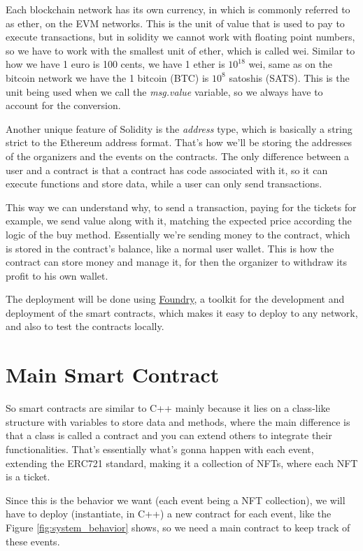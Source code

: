 Each blockchain network has its own currency, in which is commonly referred to as ether, on the EVM networks. This is the unit of value that is used to pay to execute transactions, but in solidity we cannot work with floating point numbers, so we have to work with the smallest unit of ether, which is called wei. Similar to how we have 1 euro is 100 cents, we have 1 ether is $10^{18}$ wei, same as on the bitcoin network we have the 1 bitcoin (BTC) is $10^{8}$ satoshis (SATS). This is the unit being used when we call the \textit{msg.value} variable, so we always have to account for the conversion.

Another unique feature of Solidity is the \textit{address} type, which is basically a string strict to the Ethereum address format. That's how we'll be storing the addresses of the organizers and the events on the contracts. The only difference between a user and a contract is that a contract has code associated with it, so it can execute functions and store data, while a user can only send transactions.

This way we can understand why, to send a transaction, paying for the tickets for example, we send value along with it, matching the expected price according the logic of the buy method. Essentially we're sending money to the contract, which is stored in the contract's balance, like a normal user wallet. This is how the contract can store money and manage it, for then the organizer to withdraw its profit to his own wallet.

The deployment will be done using \href{https://book.getfoundry.sh/}{Foundry}, a toolkit for the development and deployment of the smart contracts, which makes it easy to deploy to any network, and also to test the contracts locally.

\section{Main Smart Contract}
\label{sec:main_smart_contract}

So smart contracts are similar to C++ mainly because it lies on a class-like structure with variables to store data and methods, where the main difference is that a class is called a contract and you can extend others to integrate their functionalities. That's essentially what's gonna happen with each event, extending the ERC721 standard, making it a collection of NFTs, where each NFT is a ticket.

Since this is the behavior we want (each event being a NFT collection), we will have to deploy (instantiate, in C++) a new contract for each event, like the Figure \ref{fig:system_behavior} shows, so we need a main contract to keep track of these events.

